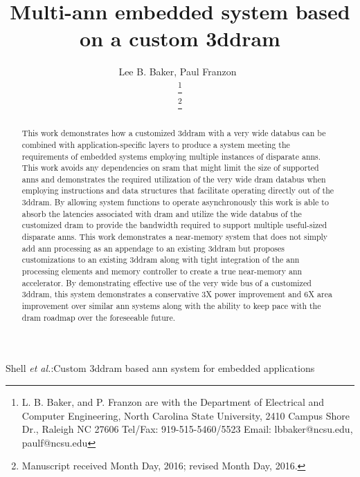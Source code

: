 \documentclass[journal]{IEEEtran}
\begin{document}
\title{Multi-\acs{ann} embedded system based on a custom \acs{3ddram}}
%
%
\author{{Lee B. Baker, Paul Franzon~}%

\thanks{L. B. Baker, and P. Franzon are with the Department of Electrical and Computer Engineering,
North Carolina State University,
2410 Campus Shore Dr., Raleigh NC 27606 
Tel/Fax:
919-515-5460/5523
Email: 
lbbaker@ncsu.edu,
paulf@ncsu.edu}

\thanks{Manuscript received Month Day, 2016; revised Month Day, 2016.}}


%
{Shell \MakeLowercase{\textit{et al.}}:Custom \acs{3ddram} based \acs{ann} system for embedded applications}

\maketitle

\begin{abstract}

This work demonstrates how a customized \acf{3ddram} with a very wide databus can be combined with application-specific layers to produce a system meeting the requirements of embedded systems employing multiple instances of disparate \acfp{ann}.
This work avoids any dependencies on \ac{sram} that might limit the size of supported \acp{ann} and demonstrates the required utilization of the very wide \ac{dram} databus when employing instructions and data structures that facilitate operating directly out of the \ac{3ddram}.
By allowing system functions to operate asynchronously this work is able to absorb the latencies associated with \ac{dram} and utilize the wide databus of the customized \ac{dram} to provide the bandwidth required to support multiple useful-sized disparate \acp{ann}.
This work demonstrates a near-memory system that does not simply add \ac{ann} processing as an appendage to an existing \ac{3ddram} but proposes customizations to an existing \ac{3ddram} along with tight integration of the \ac{ann} processing elements and memory controller to 
create a true near-memory \ac{ann} accelerator.
By demonstrating effective use of the very wide bus of a customized \ac{3ddram}, this system demonstrates a conservative 3X power improvement and 6X area improvement over similar \ac{ann} systems along with the ability to keep pace with the \ac{dram} roadmap over the foreseeable future.

\end{abstract}
\end{document}
